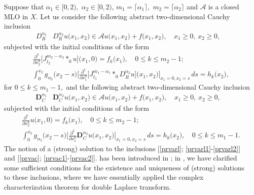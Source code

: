 \documentclass{amsart}
\theoremstyle{definition}
\theoremstyle{remark}
\numberwithin{equation}{section}
\begin{document}
Suppose that $\alpha_{1}\in [0,2),$ $\alpha_{2}\in [0,2)$, $m_{1}=\lceil \alpha_{1} \rceil,$ $m_{2}=\lceil \alpha_{2} \rceil$ and ${\mathcal A}$ is a closed MLO in $X.$  
Let us consider the following abstract two-dimensional Cauchy inclusion 
\begin{align}\label{prvarl}
D_{R}^{\alpha_{1}}& D_{R}^{\alpha_{2}}u\bigl( x_{1},x_{2} \bigr)\in {\mathcal A}u\bigl( x_{1},x_{2} \bigr)+f\bigl( x_{1},x_{2} \bigr),\quad x_{1}\geq 0,\ x_{2}\geq 0,
\end{align}
subjected with the initial conditions of the form
\begin{align}\label{prvarl1}
&\frac{\partial ^{k}}{\partial x_{2}^{k}}\Biggl[J_{t_{2}}^{m_{2}-\alpha_{2}}\ast_{0} u\Biggr]\bigl( x_{1},0 \bigr)=f_{k}\bigl( x_{1} \bigr),\quad 0\leq k\leq m_{2}-1;
\\\label{prvarl2}& \int_{0}^{x_{2}}g_{{\alpha_{2}}}\bigl(x_{2}-s\bigr)\Biggl[ \frac{\partial ^{k}}{\partial x_{1}^{k}}
\Biggl[J_{t_{1}}^{m_{1}-\alpha_{1}}\ast_{0}
D_{R}^{\alpha_{2}}u\Biggr]\bigl( x_{1},x_{2}\bigr)\Biggr]_{x_{1}=0,x_{2}=s}\, ds =h_{k}\bigl( x_{2} \bigr),
\end{align}
for $0\leq k\leq m_{1}-1,$
and the following abstract two-dimensional Cauchy inclusion
\begin{align}\label{prvac}
{\mathbf D}_{C}^{\alpha_{1}}&{\mathbf D}_{C}^{\alpha_{2}}u\bigl( x_{1},x_{2} \bigr)\in {\mathcal A}u\bigl( x_{1},x_{2} \bigr)+f\bigl( x_{1},x_{2} \bigr),\quad x_{1}\geq 0,\ x_{2}\geq 0,
\end{align}
subjected with the initial conditions of the form
\begin{align}\label{prvac1}
&\frac{\partial ^{k}}{\partial x_{2}^{k}}u\bigl( x_{1},0 \bigr)=f_{k}\bigl( x_{1} \bigr),\quad 0\leq k\leq m_{2}-1;
\\\label{prvac2}&\int_{0}^{x_{2}}g_{{\alpha_{2}}}\bigl(x_{2}-s\bigr)\Biggl[ \frac{\partial ^{k}}{\partial x_{1}^{k}}{\mathbf D}_{C}^{\alpha_{2}}u\bigl( x_{1},x_{2}\bigr)\Biggr]_{x_{1}=0,x_{2}=s}\, ds=h_{k}\bigl( x_{2} \bigr),\quad 0\leq k\leq m_{1}-1.
\end{align}
The notion of a (strong) solution to the inclusions  [\eqref{prvarl}; \eqref{prvarl1}-\eqref{prvarl2}] and [\eqref{prvac}; \eqref{prvac1}-\eqref{prvac2}]. has been introduced in \cite[Definition 4]{axioms}; in \cite[Theorem 3]{axioms}, we have clarified some sufficient conditions for the existence and uniqueness of (strong) solutions to these inclusions, where we have essentially applied the complex characterization theorem for double Laplace transform.
\end{document}
